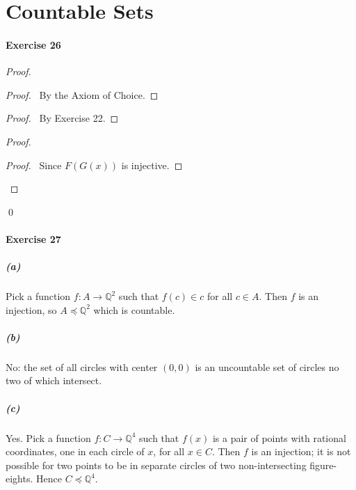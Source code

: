 \documentclass{report}
\begin{document}
    \section{Countable Sets}

    \paragraph{Exercise 26}
    \begin{proof}
        \pf
        \begin{proof}
            \pf\ By the Axiom of Choice.
        \end{proof}
        \begin{proof}
            \pf\ By Exercise 22.
        \end{proof}
        \begin{proof}
            \begin{proof}
                \pf\ Since $F(G(x))$ is injective.
            \end{proof}
        \end{proof}
        \qed
    \end{proof}

    \paragraph{Exercise 27}
    \subparagraph{(a)}
    Pick a function $f : A \rightarrow \mathbb{Q}^2$ such that $f(c) \in c$ for all $c \in A$.
    Then $f$ is an injection, so $A \preccurlyeq \mathbb{Q}^2$ which is countable.
    \subparagraph{(b)}
    No: the set of all circles with center $(0,0)$ is an uncountable set of circles no two of which intersect.
    \subparagraph{(c)}
    Yes. Pick a function $f : C \rightarrow \mathbb{Q}^4$ such that $f(x)$ is a pair of points with rational
    coordinates, one in each circle of $x$, for all $x \in C$. Then $f$ is an injection; it is not possible
    for two points to be in separate circles of two non-intersecting figure-eights. Hence $C \preccurlyeq
    \mathbb{Q}^4$.
\end{document}
